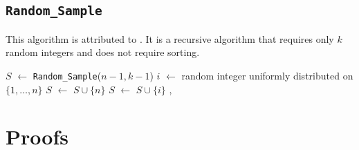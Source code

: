 \documentclass[12pt]{article}
\newcommand*\Let[2]{\State #1 $\gets$ #2}
\newcommand{\todo}[1]{{\color{red}{TO DO: \sc #1}}}
\begin{document}
\subsection{\texttt{Random\_Sample}}
This algorithm is attributed to \citet{cormen_introduction_2009}.
It is a recursive algorithm that requires only $k$ random integers and does not require sorting.
\todo{prove by recursion that the method works}


\begin{algorithm}                      %
\caption{$Random\_Sample$}
\label{Random_Sample}
\begin{algorithmic}[1]               %
\Statex
{}
\Else
     \Let{$S$}{\texttt{Random\_Sample}($n-1, k-1$)}
     \Let{$i$}{random integer uniformly distributed on $\{1, \dots, n\}$} 
           \Let{$S$}{$S \cup \{n\}$}
     \Else
            \Let{$S$}{$S\cup\{i\}$}  
     \EndIf, 
\EndIf
\EndFunction
\end{algorithmic}
\end{algorithm}

\section{Proofs}
\end{document}
